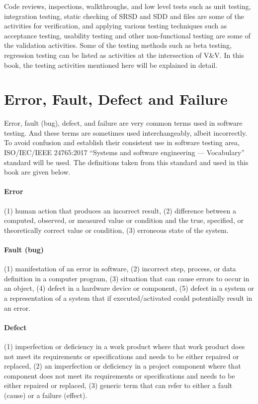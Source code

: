 Code reviews, inspections, walkthroughs, and low level tests such as unit testing, integration testing, static checking of SRSD and SDD and files are some of the activities for verification, and applying various testing techniques such as acceptance testing, usability testing and other non-functional testing are some of the validation activities. Some of the testing methods such as beta testing, regression testing can be listed as activities at the intersection of V\&V. In this book, the testing activities mentioned here will be explained in detail.

\section{Error, Fault, Defect and Failure}
Error, fault (bug), defect, and failure are very common terms used in software testing. And these terms are sometimes used interchangeably, albeit incorrectly. To avoid confusion and establish their consistent use in software testing area, ISO/IEC/IEEE 24765:2017 “Systems and software engineering — Vocabulary” standard will be used. The definitions taken from this standard and used in this book are given below.

\paragraph{Error}
(1) human action that produces an incorrect result, (2) difference between a computed, observed, or measured value or condition and the true, specified, or theoretically correct value or condition, (3) erroneous state of the system.

\paragraph{Fault (bug)}
(1) manifestation of an error in software, (2) incorrect step, process, or data definition in a computer program, (3) situation that can cause errors to occur in an object, (4) defect in a hardware device or component, (5) defect in a system or a representation of a system that if executed/activated could potentially result in an error.

\paragraph{Defect}
(1) imperfection or deficiency in a work product where that work product does not meet its requirements or specifications and needs to be either repaired or replaced, (2) an imperfection or deficiency in a project component where that component does not meet its requirements or specifications and needs to be either repaired or replaced, (3) generic term that can refer to either a fault (cause) or a failure (effect). 

